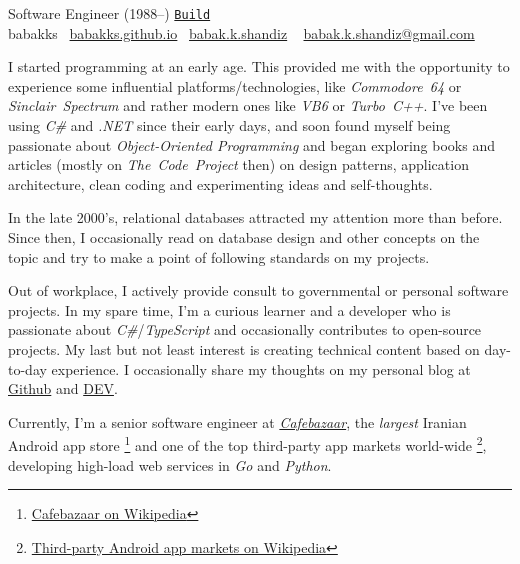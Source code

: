 \documentclass[10pt,a4paper]{article}
\begin{document}
%
{Software Engineer (1988--)}%
{\href{https://github.com/babakks/my-resume}{\tiny\color{gray}\texttt{Build\buildno}}}
\\
\noindent
\href{https://github.com/babakks}{\githubmark}
\href{https://www.linkedin.com/in/babakks/}{\linkedin}
\href{https://dev.to/babakks}{\devbadge}
babakks
\headerentrybreak
{}~\href{https://babakk.github.io}{babakks.github.io}
\hfill
\skypeicon~\href{skype:live:babak.k.shandiz}{babak.k.shandiz}
\headerentrybreak
{}~%
\href{mailto:babak.k.shandiz@gmail.com}{babak.k.shandiz@gmail.com}

\spacedhrule{0.9em}{-0.4em}

\vspace{-1.3em} %
\begin{multicols}{2}  %
    \noindent
    I started programming at an early age. This provided me with the opportunity
    to experience some influential platforms/technologies, like
    \textit{Commodore~64} or \textit{Sinclair~Spectrum} and rather modern ones
    like \textit{VB6} or \textit{Turbo~C++}. I've been using \textit{C\#} and
    \textit{.NET} since their early days, and soon found myself being passionate
    about \textit{Object-Oriented Programming} and began exploring books and
    articles (mostly on \textit{The~Code~Project} then) on design patterns,
    application architecture, clean coding and experimenting ideas and
    self-thoughts.

    In the late 2000's, relational databases attracted my attention more than
    before. Since then, I occasionally read on database design and other
    concepts on the topic and try to make a point of following standards on my
    projects.

    Out of workplace, I actively provide consult to governmental or personal
    software projects. In my spare time, I'm a curious learner and a developer who
    is passionate about \textit{C\#}/\textit{TypeScript} and occasionally
    contributes to open-source projects. My last but not least interest is
    creating technical content based on day-to-day experience. I
    occasionally share my thoughts on my personal blog at
    \href{https://babakks.github.io}{Github} and
    \href{https://dev.to/babakks}{DEV}.

    Currently, I'm a senior software engineer at
    \href{https://cafebazaar.ir}{\emph{Cafebazaar}}, the \textit{largest}
    Iranian Android app store%
    \footnote{\label{cb-on-wiki}%
        \href{https://en.wikipedia.org/wiki/Cafe\_Bazaar}{Cafebazaar on Wikipedia}}%
    and one of the top third-party app markets world-wide%
    \footnote{\label{3rd-party-stores-on-wiki}%
        \href{https://en.wikipedia.org/wiki/List\_of\_mobile\_app\_distribution\_platforms\#Third-party\_platforms}%
        {Third-party Android app markets on Wikipedia}},
    developing high-load web services in \textit{Go} and \textit{Python}.
\end{multicols}
\spacedhrule{0.5em}{-0.4em}
\end{document}
